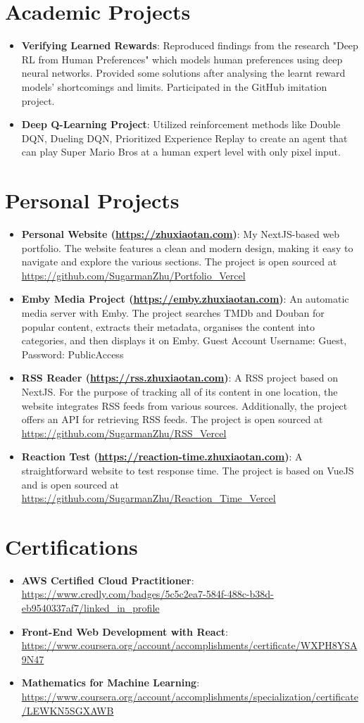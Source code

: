 \documentclass[letterpaper,11pt]{article}
\newcommand{\resumeItem}[2]{
  \item\small{
    \textbf{#1}{: #2 \vspace{-2pt}}
  }
}
\newcommand{\resumeSubItem}[2]{\resumeItem{#1}{#2}\vspace{-4pt}}
\newcommand{\resumeSubHeadingListStart}{\begin{itemize}[leftmargin=*]}
\newcommand{\resumeSubHeadingListEnd}{\end{itemize}}
\begin{document}
\section{Academic Projects}
\resumeSubHeadingListStart
\resumeSubItem{Verifying Learned Rewards}{Reproduced findings from the research "Deep RL from Human Preferences" which models human preferences using deep neural networks. Provided some solutions after analysing the learnt reward models' shortcomings and limits. Participated in the GitHub imitation project.}
\resumeSubItem{Deep Q-Learning Project}{Utilized reinforcement methods like Double DQN, Dueling DQN, Prioritized Experience Replay to create an agent that can play Super Mario Bros at a human expert level with only pixel input.}
\resumeSubHeadingListEnd

\section{Personal Projects}
\resumeSubHeadingListStart
\resumeSubItem{Personal Website (\url{https://zhuxiaotan.com})}{My NextJS-based web portfolio. The website features a clean and modern design, making it easy to navigate and explore the various sections. The project is open sourced at \url{https://github.com/SugarmanZhu/Portfolio_Vercel}}
\resumeSubItem{Emby Media Project (\url{https://emby.zhuxiaotan.com})}{An automatic media server with Emby. The project searches TMDb and Douban for popular content, extracts their metadata, organises the content into categories, and then displays it on Emby. Guest Account Username: Guest, Password: PublicAccess}
\resumeSubItem{RSS Reader (\url{https://rss.zhuxiaotan.com})}{A RSS project based on NextJS. For the purpose of tracking all of its content in one location, the website integrates RSS feeds from various sources. Additionally, the project offers an API for retrieving RSS feeds. The project is open sourced at \url{https://github.com/SugarmanZhu/RSS_Vercel}}
\resumeSubItem{Reaction Test (\url{https://reaction-time.zhuxiaotan.com})}{A straightforward website to test response time. The project is based on VueJS and is open sourced at \url{https://github.com/SugarmanZhu/Reaction_Time_Vercel}}
\resumeSubHeadingListEnd

\section{Certifications}
\resumeSubHeadingListStart
\resumeSubItem{AWS Certified Cloud Practitioner}{\url{https://www.credly.com/badges/5c5c2ea7-584f-488c-b38d-eb9540337af7/linked_in_profile}}
\resumeSubItem{Front-End Web Development with React}{\url{https://www.coursera.org/account/accomplishments/certificate/WXPH8YSA9N47}}
\resumeSubItem{Mathematics for Machine Learning}{\url{https://www.coursera.org/account/accomplishments/specialization/certificate/LEWKN5SGXAWB}}
\resumeSubHeadingListEnd
\end{document}
